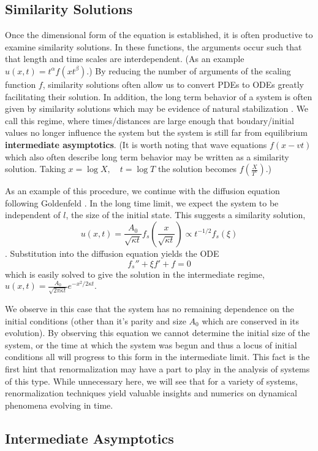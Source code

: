 \subsection{Similarity Solutions}
Once the dimensional form of the equation is established, it is often productive to
examine similarity solutions.  In these functions, the arguments occur such that that length
and time scales are interdependent. (As an example $u(x, t) = t^\alpha f(x t^\beta).$)
By reducing the number of arguments of the scaling function $f$, similarity solutions
often allow us to convert PDEs to ODEs greatly facilitating their solution.  In addition,
the long term behavior of a system is often given by similarity solutions which may be
evidence of natural stabilization \cite{Barenblatt1996}.  We call this regime, where
times/distances are large enough that boudary/initial values no longer influence the system
but the system is still far from equilibrium \textbf{intermediate asymptotics}. (It is
worth noting that wave equations $f(x - vt)$ which also often describe long term behavior
may be written as a similarity solution.  Taking $x = \log X,\quad t = \log T$ the
solution becomes $f(\frac{X}{T^v})$.)

As an example of this procedure, we continue with the diffusion equation following
Goldenfeld \cite{Goldenfeld1992}.  In the long time limit, we expect the system
to be independent of $l$, the size of the initial state.  This suggests a similarity
solution,
\[u(x, t)  = \frac{A_0}{\sqrt{\kappa t}} f_s\left(\frac{x}{\sqrt{\kappa t}}\right) \propto t^{-1/2} f_s(\xi) \].
Substitution into the diffusion equation yields the ODE
\[f_s'' + \xi f' + f = 0\]
which is easily solved to give the solution in the intermediate regime,
$u(x, t) = \frac{A_0}{\sqrt{2\pi \kappa t}} e^{-x^2 / 2\kappa t}.$

We observe in this case that the system has no remaining dependence on the initial conditions
(other than it's parity and size $A_0$ which are conserved in its evolution).  By observing
this equation we cannot determine the initial size of the system, or the time at which the
system was begun and thus a locus of initial conditions all will progress to this form
in the intermediate limit.  This fact is the first hint that renormalization may have a
part to play in the analysis of systems of this type.  While unnecessary here, we will see
that for a variety of systems, renormalization techniques yield valuable insights and
numerics on dynamical phenomena evolving in time.  

\subsection{Intermediate Asymptotics}


